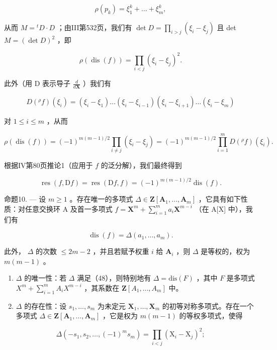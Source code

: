 \[
\rho (p _ {k}) = \xi_ {1} ^ {k} + \dots + \xi_ {m} ^ {k},
\]

从而 \(M = {}^t D \cdot D\) ；由III第532页，我们有 \(\det D = \prod_{i > j} (\xi_i - \xi_j)\) 且 det \(M = (\det D)^2\) ，即

\[
\rho (\operatorname{dis} (f)) = \prod_ {i <   j} \left(\xi_ {i} - \xi_ {j}\right) ^ {2}.\tag{46}
\]

此外（用 D 表示导子 \(\frac{d}{d\mathbf{X}}\) ）我们有

\[
D (^ {\rho} f) (\xi_ {i}) = (\xi_ {i} - \xi_ {1}) \dots (\xi_ {i} - \xi_ {i - 1}) (\xi_ {i} - \xi_ {i + 1}) \dots (\xi_ {i} - \xi_ {m})
\]

对 \(1 \leqslant i \leqslant m\) ，从而

\[
\rho (\operatorname{dis} (f)) = (- 1) ^ {m (m - 1) / 2} \prod_ {i \neq j} (\xi_ {i} - \xi_ {j}) = (- 1) ^ {m (m - 1) / 2} \prod_ {i = 1} ^ {m} D (^ {\rho} f) (\xi_ {i}).
\]

根据IV第80页推论1（应用于 \(f\) 的泛分解），我们最终得到

\[
\operatorname{res} (f, \mathrm{D} f) = \operatorname{res} (\mathrm{D} f, f) = (- 1) ^ {m (m - 1) / 2} \operatorname{dis} (f).\tag{47}
\]

命题10. --- 设 \(m \geqslant 1\) 。存在唯一的多项式 \(\Delta \in \mathbf{Z}[\mathbf{A}_1, \ldots, \mathbf{A}_m]\) ，它具有如下性质：对任意交换环 A 及首一多项式 \(f = \mathbf{X}^m + \sum_{i=1}^{m} a_i \mathbf{X}^{m-i}\) （在 A{[}X{]} 中），我们有

\[
\operatorname{dis} (f) = \Delta \left(a _ {1}, \dots , a _ {m}\right).\tag{48}
\]

此外， \(\Delta\) 的次数 \(\leqslant 2m - 2\) ，并且若赋予权重 \(i\) 给 \(\mathbf{A}_i\) ，则 \(\Delta\) 是等权的，权为 \(m(m - 1)\) 。

\begin{enumerate}
\def\labelenumi{\alph{enumi})}
\item
  \(\Delta\) 的唯一性：若 \(\Delta\) 满足（48），则特别地有 \(\Delta = \text{dis}(F)\) ，其中 \(F\) 是多项式 \(X^{m} + \sum_{i=1}^{m} A_{i} X^{m-i}\) ，其系数在 \(\mathbf{Z}[A_{1}, \ldots, A_{m}]\) 中。
\item
  \(\Delta\) 的存在性：设 \(s_1, \ldots, s_m\) 为未定元 \(\mathbf{X}_1, \ldots, \mathbf{X}_m\) 的初等对称多项式。存在一个多项式 \(\Delta \in \mathbf{Z}[\mathbf{A}_1, \ldots, \mathbf{A}_m]\) ，它是权为 \(m(m-1)\) 的等权多项式，使得
\end{enumerate}

\[
\Delta \left(- s _ {1}, s _ {2}, \dots , (- 1) ^ {m} s _ {m}\right) = \prod_ {i <   j} \left(\mathrm{X} _ {i} - \mathrm{X} _ {j}\right) ^ {2};\tag{49}
\]

